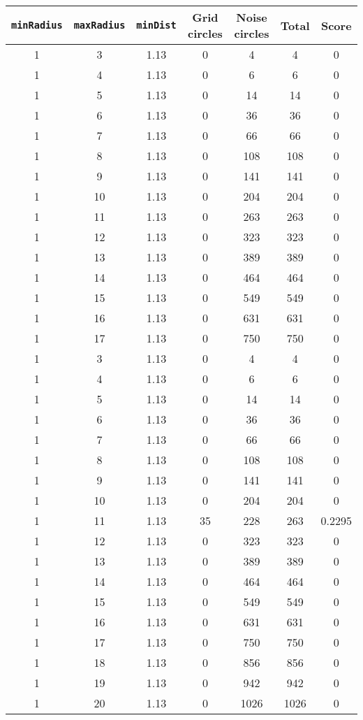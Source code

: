 \documentclass[letterpaper, 12pt]{article}
\begin{document}
\begin{longtable}{|c|c|c|c|c|c|c|}
\hline
\textbf{\texttt{minRadius}} & \textbf{\texttt{maxRadius}} & \textbf{\texttt{minDist}} & \textbf{Grid circles} & \textbf{Noise circles} & \textbf{Total} & \textbf{Score} \\
\hline
1 & 3 & 1.13 & 0 & 4 & 4 & 0 \\
\hline
1 & 4 & 1.13 & 0 & 6 & 6 & 0 \\
\hline
1 & 5 & 1.13 & 0 & 14 & 14 & 0 \\
\hline
1 & 6 & 1.13 & 0 & 36 & 36 & 0 \\
\hline
1 & 7 & 1.13 & 0 & 66 & 66 & 0 \\
\hline
1 & 8 & 1.13 & 0 & 108 & 108 & 0 \\
\hline
1 & 9 & 1.13 & 0 & 141 & 141 & 0 \\
\hline
1 & 10 & 1.13 & 0 & 204 & 204 & 0 \\
\hline
1 & 11 & 1.13 & 0 & 263 & 263 & 0 \\
\hline
1 & 12 & 1.13 & 0 & 323 & 323 & 0 \\
\hline
1 & 13 & 1.13 & 0 & 389 & 389 & 0 \\
\hline
1 & 14 & 1.13 & 0 & 464 & 464 & 0 \\
\hline
1 & 15 & 1.13 & 0 & 549 & 549 & 0 \\
\hline
1 & 16 & 1.13 & 0 & 631 & 631 & 0 \\
\hline
1 & 17 & 1.13 & 0 & 750 & 750 & 0 \\
\hline
1 & 3 & 1.13 & 0 & 4 & 4 & 0 \\
\hline
1 & 4 & 1.13 & 0 & 6 & 6 & 0 \\
\hline
1 & 5 & 1.13 & 0 & 14 & 14 & 0 \\
\hline
1 & 6 & 1.13 & 0 & 36 & 36 & 0 \\
\hline
1 & 7 & 1.13 & 0 & 66 & 66 & 0 \\
\hline
1 & 8 & 1.13 & 0 & 108 & 108 & 0 \\
\hline
1 & 9 & 1.13 & 0 & 141 & 141 & 0 \\
\hline
1 & 10 & 1.13 & 0 & 204 & 204 & 0 \\
\hline
1 & 11 & 1.13 & 35 & 228 & 263 & 0.2295 \\
\hline
1 & 12 & 1.13 & 0 & 323 & 323 & 0 \\
\hline
1 & 13 & 1.13 & 0 & 389 & 389 & 0 \\
\hline
1 & 14 & 1.13 & 0 & 464 & 464 & 0 \\
\hline
1 & 15 & 1.13 & 0 & 549 & 549 & 0 \\
\hline
1 & 16 & 1.13 & 0 & 631 & 631 & 0 \\
\hline
1 & 17 & 1.13 & 0 & 750 & 750 & 0 \\
\hline
1 & 18 & 1.13 & 0 & 856 & 856 & 0 \\
\hline
1 & 19 & 1.13 & 0 & 942 & 942 & 0 \\
\hline
1 & 20 & 1.13 & 0 & 1026 & 1026 & 0 \\
\hline
\end{longtable}
\end{document}
